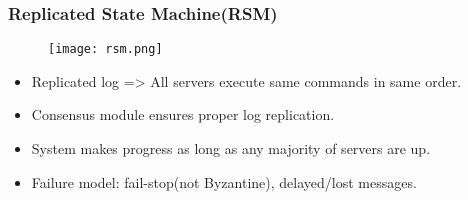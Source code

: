 \begin{frame}
    \frametitle{Replicated State Machine(RSM)}
    \begin{figure}
       \centering
        \texttt{[image: rsm.png]}
    \end{figure}

    \begin{itemize}
        \item Replicated log => \alert{All servers execute same commands in same order}.
        \item Consensus module ensures proper log replication.
        \item System makes progress as long as any majority of servers are up.
        \item Failure model: fail-stop(not Byzantine), delayed/lost messages.
    \end{itemize}
\end{frame}


%
